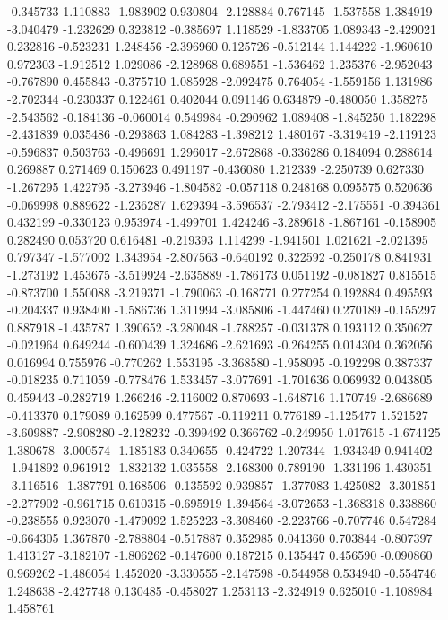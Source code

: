 -0.345733
1.110883
-1.983902
0.930804
-2.128884
0.767145
-1.537558
1.384919
-3.040479
-1.232629
0.323812
-0.385697
1.118529
-1.833705
1.089343
-2.429021
0.232816
-0.523231
1.248456
-2.396960
0.125726
-0.512144
1.144222
-1.960610
0.972303
-1.912512
1.029086
-2.128968
0.689551
-1.536462
1.235376
-2.952043
-0.767890
0.455843
-0.375710
1.085928
-2.092475
0.764054
-1.559156
1.131986
-2.702344
-0.230337
0.122461
0.402044
0.091146
0.634879
-0.480050
1.358275
-2.543562
-0.184136
-0.060014
0.549984
-0.290962
1.089408
-1.845250
1.182298
-2.431839
0.035486
-0.293863
1.084283
-1.398212
1.480167
-3.319419
-2.119123
-0.596837
0.503763
-0.496691
1.296017
-2.672868
-0.336286
0.184094
0.288614
0.269887
0.271469
0.150623
0.491197
-0.436080
1.212339
-2.250739
0.627330
-1.267295
1.422795
-3.273946
-1.804582
-0.057118
0.248168
0.095575
0.520636
-0.069998
0.889622
-1.236287
1.629394
-3.596537
-2.793412
-2.175551
-0.394361
0.432199
-0.330123
0.953974
-1.499701
1.424246
-3.289618
-1.867161
-0.158905
0.282490
0.053720
0.616481
-0.219393
1.114299
-1.941501
1.021621
-2.021395
0.797347
-1.577002
1.343954
-2.807563
-0.640192
0.322592
-0.250178
0.841931
-1.273192
1.453675
-3.519924
-2.635889
-1.786173
0.051192
-0.081827
0.815515
-0.873700
1.550088
-3.219371
-1.790063
-0.168771
0.277254
0.192884
0.495593
-0.204337
0.938400
-1.586736
1.311994
-3.085806
-1.447460
0.270189
-0.155297
0.887918
-1.435787
1.390652
-3.280048
-1.788257
-0.031378
0.193112
0.350627
-0.021964
0.649244
-0.600439
1.324686
-2.621693
-0.264255
0.014304
0.362056
0.016994
0.755976
-0.770262
1.553195
-3.368580
-1.958095
-0.192298
0.387337
-0.018235
0.711059
-0.778476
1.533457
-3.077691
-1.701636
0.069932
0.043805
0.459443
-0.282719
1.266246
-2.116002
0.870693
-1.648716
1.170749
-2.686689
-0.413370
0.179089
0.162599
0.477567
-0.119211
0.776189
-1.125477
1.521527
-3.609887
-2.908280
-2.128232
-0.399492
0.366762
-0.249950
1.017615
-1.674125
1.380678
-3.000574
-1.185183
0.340655
-0.424722
1.207344
-1.934349
0.941402
-1.941892
0.961912
-1.832132
1.035558
-2.168300
0.789190
-1.331196
1.430351
-3.116516
-1.387791
0.168506
-0.135592
0.939857
-1.377083
1.425082
-3.301851
-2.277902
-0.961715
0.610315
-0.695919
1.394564
-3.072653
-1.368318
0.338860
-0.238555
0.923070
-1.479092
1.525223
-3.308460
-2.223766
-0.707746
0.547284
-0.664305
1.367870
-2.788804
-0.517887
0.352985
0.041360
0.703844
-0.807397
1.413127
-3.182107
-1.806262
-0.147600
0.187215
0.135447
0.456590
-0.090860
0.969262
-1.486054
1.452020
-3.330555
-2.147598
-0.544958
0.534940
-0.554746
1.248638
-2.427748
0.130485
-0.458027
1.253113
-2.324919
0.625010
-1.108984
1.458761
